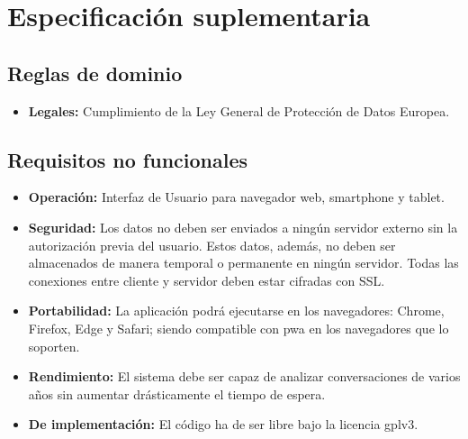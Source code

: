 \section{Especificación suplementaria}
\label{subsect:suplementary-specification}


\subsection{Reglas de dominio}

\begin{itemize}
	\item \textbf{Legales:} Cumplimiento de la Ley General de Protección de Datos Europea.
\end{itemize}

\subsection{Requisitos no funcionales}

\begin{itemize}
	\item \textbf{Operación:} Interfaz de Usuario para navegador web, smartphone y tablet.
	
	\item \textbf{Seguridad:} Los datos no deben ser enviados a ningún servidor externo sin la autorización previa del usuario. Estos datos, además, no deben ser almacenados de manera temporal o permanente en ningún servidor. Todas las conexiones entre cliente y servidor deben estar cifradas con SSL.
	
	\item \textbf{Portabilidad:} La aplicación podrá ejecutarse en los navegadores: Chrome, Firefox, Edge y Safari; siendo compatible con \acrshort{pwa} en los navegadores que lo soporten.
	
	\item \textbf{Rendimiento:} El sistema debe ser capaz de analizar conversaciones de varios años sin aumentar drásticamente el tiempo de espera.
	
	\item \textbf{De implementación:} El código ha de ser libre bajo la licencia \acrfull{gplv3}.
\end{itemize}

